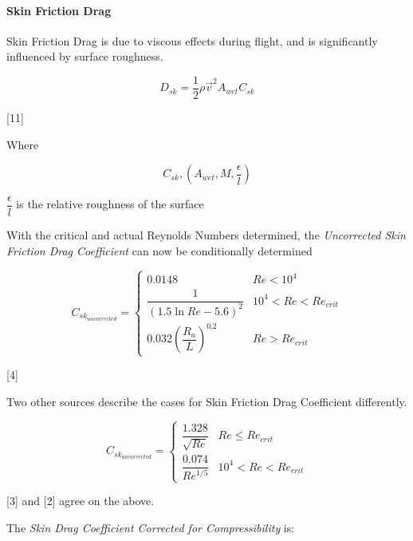 \documentclass[]{article}
\let\oldparagraph\paragraph
\renewcommand{\paragraph}[1]{\oldparagraph{#1}\mbox{}}
\begin{document}
\paragraph{Skin Friction Drag}\label{skin-friction-drag}

Skin Friction Drag is due to viscous effects during flight, and is
significantly influenced by surface roughness.

\begin{equation}
\label{friction_drag_force}
D_{sk} = \dfrac{1}{2} \rho \vec{v}^2 A_{wet} C_{sk}
\end{equation}

{[}11{]}

Where

\begin{equation}
\label{friction_drag_coefficient}
C_{sk}, (A_{wet}, M, \dfrac{\epsilon}{l} )
\end{equation}

\(\dfrac{\epsilon}{l}\) is the relative roughness of the surface

With the critical and actual Reynolds Numbers determined, the
\emph{Uncorrected Skin Friction Drag Coefficient} can now be
conditionally determined

\begin{equation}
\label{eq_skin_drag_coefficient_uncorrected}
C_{sk_{uncorrected}} = 
\begin{cases}
    0.0148                                    & Re < 10^4 \\
    \dfrac{1}{(1.5 \ln Re - 5.6)^2}            & 10^4 < Re < Re_{crit} \\
    0.032 \left( \dfrac{R_a}{L} \right)^{0.2} & Re > Re_{crit}
\end{cases}
\end{equation}

{[}4{]}

Two other sources describe the cases for Skin Friction Drag Coefficient
differently.

\begin{equation}
C_{sk_{uncorrected}} = 
\begin{cases}
    \dfrac{1.328}{\sqrt{Re}} & Re \le Re_{crit} \\
    \dfrac{0.074}{Re^{1/5}}  & 10^4 < Re < Re_{crit}
\end{cases}
\end{equation}

{[}3{]} and {[}2{]} agree on the above.

The \emph{Skin Drag Coefficient Corrected for Compressibility} is:
\end{document}
